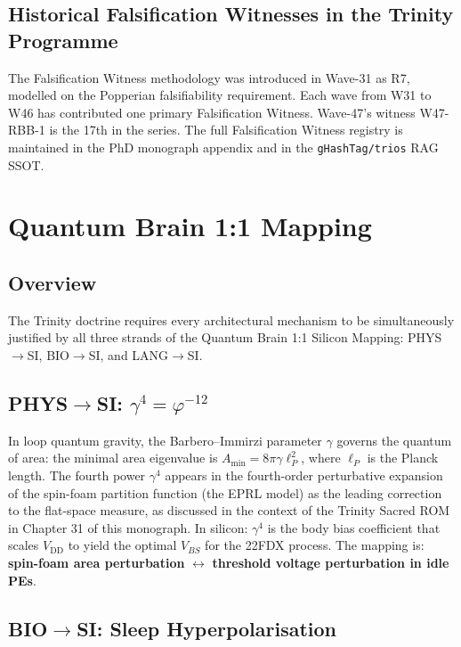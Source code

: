 \subsection{Historical Falsification Witnesses in the Trinity Programme}

The Falsification Witness methodology was introduced in Wave-31 as R7, modelled
on the Popperian falsifiability requirement.
Each wave from W31 to W46 has contributed one primary Falsification Witness.
Wave-47's witness W47-RBB-1 is the 17th in the series.
The full Falsification Witness registry is maintained in the PhD monograph
appendix and in the \texttt{gHashTag/trios} RAG SSOT.

\section{Quantum Brain 1:1 Mapping}
\label{sec:qbrain-w47}

\subsection{Overview}

The Trinity doctrine requires every architectural mechanism to be simultaneously
justified by all three strands of the Quantum Brain 1:1 Silicon Mapping:
PHYS$\to$SI, BIO$\to$SI, and LANG$\to$SI.

\subsection{PHYS$\to$SI: $\gamma^{4} = \varphi^{-12}$}

In loop quantum gravity, the Barbero--Immirzi parameter $\gamma$ governs the
quantum of area: the minimal area eigenvalue is
$A_{\min} = 8\pi \gamma \ell_P^2$, where $\ell_P$ is the Planck length.
The fourth power $\gamma^{4}$ appears in the fourth-order perturbative
expansion of the spin-foam partition function (the EPRL model) as the leading
correction to the flat-space measure, as discussed in the context of the
Trinity Sacred ROM in Chapter 31 of this monograph.
In silicon: $\gamma^{4}$ is the body bias coefficient that scales $V_{\mathrm{DD}}$
to yield the optimal $V_{BS}$ for the 22FDX process.
The mapping is: \textbf{spin-foam area perturbation}
$\leftrightarrow$ \textbf{threshold voltage perturbation in idle PEs}.

\subsection{BIO$\to$SI: Sleep Hyperpolarisation}

